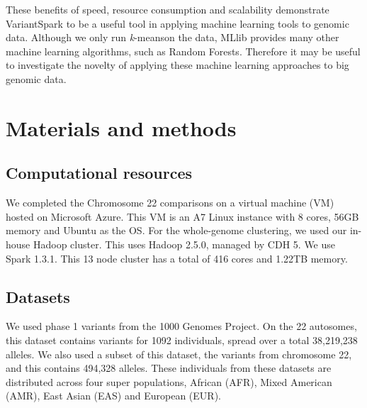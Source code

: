 \documentclass{bmcart}
\newcommand{\variantSpark}{{\sc VariantSpark}}
\newcommand{\kMeans}{\textit{k}-means}
\begin{document}
These benefits of speed, resource consumption and scalability demonstrate \variantSpark{} to be a useful tool in applying machine learning tools to genomic data. Although we only run \kMeans on the data, MLlib provides many other machine learning algorithms, such as Random Forests.
Therefore it may be useful to investigate the novelty of applying these machine learning approaches to big genomic data.  





\section*{Materials and methods}
\subsection*{Computational resources}
We completed the Chromosome 22 comparisons on a virtual machine (VM) hosted on Microsoft Azure. This VM is an A7 Linux instance with 8 cores, 56GB memory and Ubuntu as the OS. 
For the whole-genome clustering, we used our in-house Hadoop cluster. This uses Hadoop 2.5.0, managed by CDH 5. We use Spark 1.3.1. This 13 node cluster has a total of 416 cores and 1.22TB memory.


\subsection*{Datasets}
We used  phase 1 variants from the 1000 Genomes Project. On the 22 autosomes, this dataset contains variants for 1092 individuals, spread over a total 38,219,238 alleles.
We also used a subset of this dataset, the variants from chromosome 22, and this contains 494,328 alleles.
These individuals from these datasets are distributed across four super populations, African (AFR), Mixed American (AMR), East Asian (EAS) and European (EUR).
\end{document}
